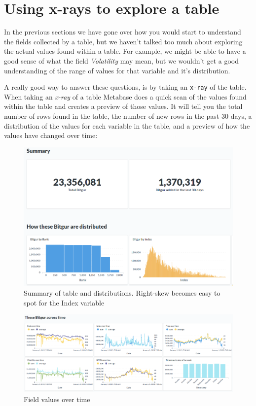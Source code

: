 \documentclass[
]{book}
\begin{document}
\hypertarget{using-x-rays-to-explore-a-table}{%
\section{Using x-rays to explore a table}\label{using-x-rays-to-explore-a-table}}

In the previous sections we have gone over how you would start to understand the fields collected by a table, but we haven't talked too much about exploring the actual values found within a table. For example, we might be able to have a good sense of what the field \emph{Volatility} may mean, but we wouldn't get a good understanding of the range of values for that variable and it's distribution.

A really good way to answer these questions, is by taking an \texttt{x-ray} of the table. When taking an \emph{x-ray} of a table Metabase does a quick scan of the values found within the table and creates a preview of those values. It will tell you the total number of rows found in the table, the number of new rows in the past 30 days, a distribution of the values for each variable in the table, and a preview of how the values have changed over time:

\begin{figure}
\centering
\includegraphics{images/BitgurXRaySummary.png}
\caption{Summary of table and distributions. Right-skew becomes easy to spot for the Index variable}
\end{figure}

\begin{figure}
\centering
\includegraphics{images/BitgurOverTime.png}
\caption{Field values over time}
\end{figure}
\end{document}
